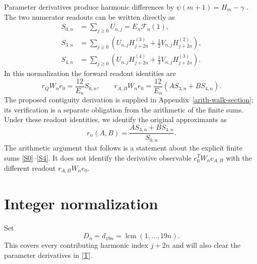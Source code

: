\documentclass[11pt]{article}
\newcommand{\F}{\mathcal F}
\begin{document}
Parameter derivatives produce harmonic differences by
$\psi(m+1)=H_m-\gamma$ \cite[Eq.~5.4.14]{DLMF}.
The two numerator readouts can be written directly as
\begin{align}
 S_{0,n}&=\sum_{j\geq0}U_{n,j}=E_n\F_n(1),\label{S0}\\
 S_{3,n}&=\sum_{j\geq0}\left(U_{n,j}H_{j+2n}^{(3)}
                      +\tfrac12V_{n,j}H_{j+2n}^{(2)}\right),\label{S3}\\
 S_{4,n}&=\sum_{j\geq0}\left(U_{n,j}H_{j+2n}^{(4)}
                      +\tfrac13V_{n,j}H_{j+2n}^{(3)}\right).\label{S4}
\end{align}
In this normalization the forward readout identities are
\begin{equation}\label{walk-readout}
 r_QW_ne_0=\frac{12}{E_n}S_{0,n},\qquad
 r_{A,B}W_ne_0=\frac{12}{E_n}(AS_{3,n}+BS_{4,n}).
\end{equation}
The proposed contiguity derivation is supplied in
Appendix~\ref{arith-walk-section}; its verification is a separate
obligation from the arithmetic of the finite sums.
Under these readout identities, we identify
the original approximants as
\[
 r_n(A,B)=\frac{AS_{3,n}+BS_{4,n}}{S_{0,n}}.
\]
The arithmetic argument that follows is a statement about the explicit
finite sums \eqref{S0}--\eqref{S4}. It does not identify the derivative
observable $e_0^TW_nc_{A,B}$ with the different readout
$r_{A,B}W_ne_0$.

\section{Integer normalization}
Set
\[
 D_n=d_{19n}=\operatorname{lcm}(1,\ldots,19n).
\]
This covers every contributing harmonic index $j+2n$ and will also
clear the parameter derivatives in \eqref{T}.
\end{document}

